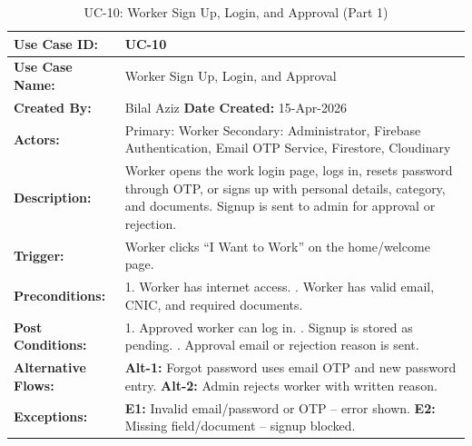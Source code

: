 {\footnotesize
\setlength{\tabcolsep}{3pt}
\renewcommand{\arraystretch}{0.9}
\begin{table}[H]
\centering
\begin{tabular}{|p{2.7cm}|p{12.1cm}|}
\hline
\textbf{Use Case ID:} & UC-10 \\ \hline
\textbf{Use Case Name:} & Worker Sign Up, Login, and Approval \\ \hline
\textbf{Created By:} & Bilal Aziz \hfill \textbf{Date Created:} 15-Apr-2026 \\ \hline
\textbf{Actors:} & Primary: Worker \quad Secondary: Administrator, Firebase Authentication, Email OTP Service, Firestore, Cloudinary \\ \hline
\textbf{Description:} & Worker opens the work login page, logs in, resets password through OTP, or signs up with personal details, category, and documents. Signup is sent to admin for approval or rejection. \\ \hline
\textbf{Trigger:} & Worker clicks ``I Want to Work'' on the home/welcome page. \\ \hline
\textbf{Preconditions:} & 1. Worker has internet access. \newline 2. Worker has valid email, CNIC, and required documents. \\ \hline
\textbf{Post Conditions:} & 1. Approved worker can log in. \newline 2. Signup is stored as pending. \newline 3. Approval email or rejection reason is sent. \\ \hline
\textbf{Alternative Flows:} & \textbf{Alt-1:} Forgot password uses email OTP and new password entry. \newline \textbf{Alt-2:} Admin rejects worker with written reason. \\ \hline
\textbf{Exceptions:} & \textbf{E1:} Invalid email/password or OTP -- error shown. \newline \textbf{E2:} Missing field/document -- signup blocked. \\ \hline
\end{tabular}
\caption*{UC-10: Worker Sign Up, Login, and Approval (Part 1)}
\end{table}
}

\newpage

